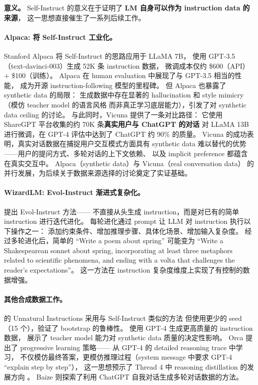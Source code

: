 \textbf{意义。}
Self-Instruct 的意义在于证明了 \textbf{LM 自身可以作为 instruction data 的来源}，
这一思想直接催生了一系列后续工作。

\paragraph{Alpaca: 将 Self-Instruct 工业化。}
Stanford Alpaca \citep{taori2023alpaca} 将 Self-Instruct 的思路应用于 LLaMA 7B，
使用 GPT-3.5（text-davinci-003）生成 52K 条 instruction 数据，
微调成本仅约 \$600（API）+ \$100（训练）。
Alpaca 在 human evaluation 中展现了与 GPT-3.5 相当的性能，
成为开源 instruction-following 模型的里程碑。
但 Alpaca 也暴露了 synthetic data 的局限：
生成数据中存在显著的 hallucination 和 style mimicry（模仿 teacher model 的语言风格
而非真正学习底层能力），引发了对 synthetic data ceiling 的讨论。
与此同时，Vicuna \citep{chiang2023vicuna} 提供了一条对比路径：
它使用 ShareGPT 平台收集的约 70K 条\textbf{真实用户与 ChatGPT 的对话}
对 LLaMA 13B 进行微调，在 GPT-4 评估中达到了 ChatGPT 约 90\% 的质量。
Vicuna 的成功表明，真实对话数据在捕捉用户交互模式方面具有
synthetic data 难以替代的优势——用户的提问方式、多轮对话的上下文依赖、
以及 implicit preference 都蕴含在真实交互中。
Alpaca（synthetic data）与 Vicuna（real conversation data）
的并行发展，为后续关于数据来源选择的讨论奠定了实证基础。

\paragraph{WizardLM: Evol-Instruct 渐进式复杂化。}
\citet{xu2024wizardlm} 提出 Evol-Instruct 方法——
不直接从头生成 instruction，而是对已有的简单 instruction 进行迭代进化。
每轮进化通过 prompt 让 LLM 对 instruction 执行以下操作之一：
添加约束条件、增加推理步骤、具体化场景、增加输入复杂度。
经过多轮进化后，简单的 ``Write a poem about spring'' 可能变为
``Write a Shakespearean sonnet about spring, incorporating at least three
metaphors related to scientific phenomena, and ending with a volta
that challenges the reader's expectations''。
这一方法在 instruction 复杂度维度上实现了有控制的数据增强。

\paragraph{其他合成数据工作。}
\citet{honovich2022unnatural} 的 Unnatural Instructions 采用与 Self-Instruct 类似的方法
但使用更少的 seed（15 个），验证了 bootstrap 的鲁棒性。
\citet{peng2023gpt4instruct} 使用 GPT-4 生成更高质量的 instruction 数据，
展示了 teacher model 能力对 synthetic data 质量的决定性影响。
Orca \citep{mukherjee2023orca} 提出了 progressive learning 策略——
从 GPT-4 的 detailed reasoning trace 中学习，
不仅模仿最终答案，更模仿推理过程（system message 中要求 GPT-4 ``explain step by step''），
这一思想预示了 Thread 4 中 reasoning distillation 的发展方向
。
Baize \citep{xu2023baize} 则探索了利用 ChatGPT 自我对话生成多轮对话数据的方法。


